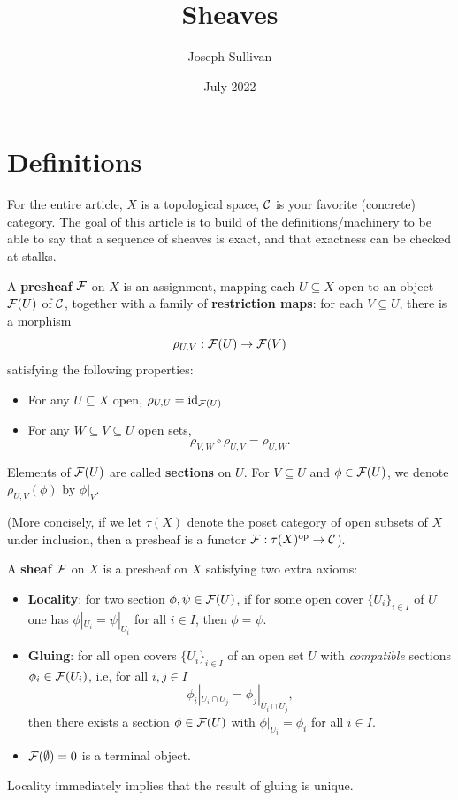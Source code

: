 \documentclass[12pt]{article}
\title{Sheaves}
\author{Joseph Sullivan}
\date{July 2022}
\begin{document}
\maketitle

\section{Definitions}

For the entire article, $X$ is a topological space, $\mathcal{C}$ is your favorite (concrete) category. The goal of this article is to build of the definitions/machinery to be able to say that a sequence of sheaves is exact, and that exactness can be checked at stalks.

\begin{defn}
    A \textbf{presheaf} $\mathcal{F}$ on $X$ is an assignment, mapping each $U\subseteq X$ open to an object $\mathcal{F}(U)$ of $\mathcal{C}$, together with a family of \textbf{restriction maps}: for each $V\subseteq U$, there is a morphism
    \[\rho_{U,V}: \mathcal{F}(U) \to \mathcal{F}(V)\]
    satisfying the following properties:
    \begin{itemize}
        \item For any $U\subseteq X$ open, $\rho_{U,U} = \mathrm{id}_{\mathcal{F}(U)}$
        \item For any $W\subseteq V\subseteq U$ open sets,
        \[\rho_{V,W} \circ \rho_{U,V} = \rho_{U,W}.\]
    \end{itemize}
    Elements of $\mathcal{F}(U)$ are called \textbf{sections} on $U$. For $V\subseteq U$ and $\phi\in \cF(U)$, we denote $\rho_{U,V}(\phi)$ by $\phi|_V$.
    
    (More concisely, if we let $\tau(X)$ denote the poset category of open subsets of $X$ under inclusion, then a presheaf is a functor $\mathcal{F}: \tau(X)^{\mathrm{op}} \to \mathcal{C}$).
\end{defn}


\begin{defn}
    A \textbf{sheaf} $\mathcal{F}$ on $X$ is a presheaf on $X$ satisfying two extra axioms:
    \begin{itemize}
        \item \textbf{Locality}: for two section $\phi,\psi \in \cF(U)$, if for some open cover $\{U_i\}_{i\in I}$ of $U$ one has $\phi|_{U_i} = \psi|_{U_i}$ for all $i\in I$, then $\phi=\psi$.
        \item \textbf{Gluing}: for all open covers $\{U_i\}_{i\in I}$ of an open set $U$ with \textit{compatible} sections $\phi_i \in \cF(U_i)$, i.e, for all $i,j\in I$
        \[\phi_i|_{U_i\cap U_j} = \phi_j|_{U_i\cap U_j},\]
        then there exists a section $\phi\in \cF(U)$ with $\phi|_{U_i} = \phi_i$ for all $i\in I$.
        \item $\mathcal{F}(\emptyset)=0$ is a terminal object.
    \end{itemize}
    Locality immediately implies that the result of gluing is unique.
\end{defn}
\end{document}
